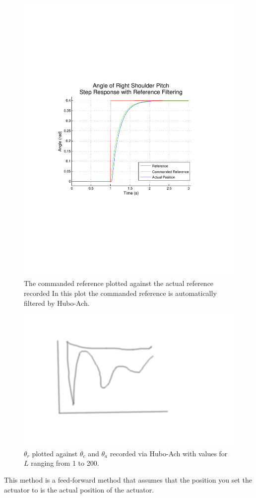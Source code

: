 \begin{figure}[thpb]
  \centering
\includegraphics[width=0.8\columnwidth]{./examples/pix/RSP-Zp4-step-filter-real-crop.pdf}
  \caption{The commanded reference plotted against the actual reference recorded  In this plot the commanded reference is automatically filtered by Hubo-Ach.}
  \label{fig:singleJointStepFiltered}
\end{figure}

\begin{figure}[thpb]
  \centering
\includegraphics[width=0.8\columnwidth]{./pix/tmp.png}
  \caption{$\theta_r$ plotted against $\theta_c$ and $\theta_a$ recorded via Hubo-Ach with values for $L$ ranging from 1 to 200.}
  \label{fig:singleJointStepFilteredLtest}
\end{figure}

This method is a feed-forward method that assumes that the position you set the actuator to is the actual position of the actuator.
